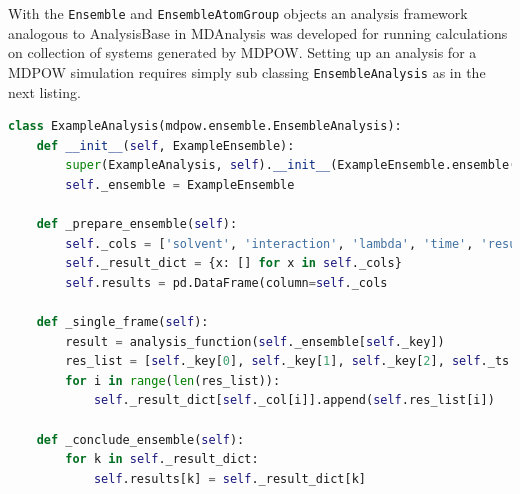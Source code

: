 \documentclass{article}[letterpaper, margins=1in, 12pt]
\begin{document}
With the \texttt{Ensemble} and \texttt{EnsembleAtomGroup} objects an analysis framework analogous to AnalysisBase in MDAnalysis was developed for running calculations on collection of systems generated by MDPOW. Setting up an analysis for a MDPOW simulation requires simply sub classing \texttt{EnsembleAnalysis} as in the next listing.

\begin{lstlisting}[language=Python]
class ExampleAnalysis(mdpow.ensemble.EnsembleAnalysis):
	def __init__(self, ExampleEnsemble):
		super(ExampleAnalysis, self).__init__(ExampleEnsemble.ensemble())
		self._ensemble = ExampleEnsemble

	def _prepare_ensemble(self):
		self._cols = ['solvent', 'interaction', 'lambda', 'time', 'result']
		self._result_dict = {x: [] for x in self._cols}
		self.results = pd.DataFrame(column=self._cols

	def _single_frame(self):
		result = analysis_function(self._ensemble[self._key])
		res_list = [self._key[0], self._key[1], self._key[2], self._ts.time, result]
		for i in range(len(res_list)):
			self._result_dict[self._col[i]].append(self.res_list[i])

	def _conclude_ensemble(self):
		for k in self._result_dict:
			self.results[k] = self._result_dict[k]

\end{lstlisting}
\end{document}
